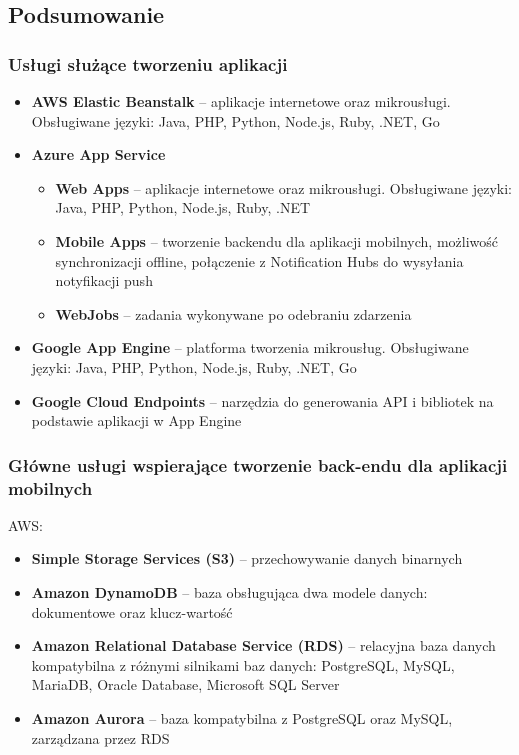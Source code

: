 \documentclass[12pt,a4paper,twoside,titlepage,openright]{book}
\begin{document}
\subsection*{Podsumowanie}

\subsubsection{Usługi służące tworzeniu aplikacji}
\begin{itemize}
\item \textbf{AWS Elastic Beanstalk} -- aplikacje internetowe oraz mikrousługi. Obsługiwane języki: Java, PHP, Python, Node.js, Ruby, .NET, Go
\item \textbf{Azure App Service}
	\begin{itemize}
		\item \textbf{Web Apps} -- aplikacje internetowe oraz mikrousługi. Obsługiwane języki:  Java, PHP, Python, Node.js, Ruby, .NET
		\item \textbf{Mobile Apps} -- tworzenie backendu dla aplikacji mobilnych, możliwość synchronizacji offline, połączenie z Notification Hubs do wysyłania notyfikacji push
		\item \textbf{WebJobs} -- zadania wykonywane po odebraniu zdarzenia
	\end{itemize}
\item \textbf{Google App Engine} -- platforma tworzenia mikrousług. Obsługiwane języki: Java, PHP, Python, Node.js, Ruby, .NET, Go
\item \textbf{Google Cloud Endpoints} -- narzędzia do generowania API i bibliotek na podstawie aplikacji w App Engine
\end{itemize}

\subsubsection{Główne usługi wspierające tworzenie back-endu dla aplikacji mobilnych}

AWS:
\begin{itemize}
\item \textbf{Simple Storage Services (S3)} -- przechowywanie danych binarnych
\item \textbf{Amazon DynamoDB} -- baza obsługująca dwa modele danych: dokumentowe oraz klucz-wartość
\item \textbf{Amazon Relational Database Service (RDS)} -- relacyjna baza danych kompatybilna z różnymi silnikami baz danych: PostgreSQL, MySQL, MariaDB, Oracle Database, Microsoft SQL Server
\item \textbf{Amazon Aurora} -- baza kompatybilna z PostgreSQL oraz MySQL, zarządzana przez RDS
\end{itemize}
\end{document}
